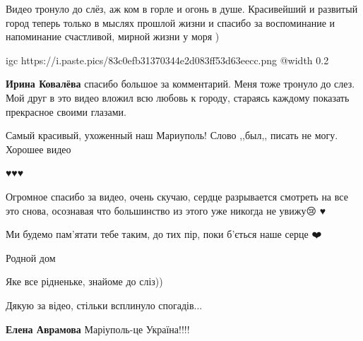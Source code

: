  
 
 
 
 

\qqSecCmt


Видео тронуло до слёз, аж ком в горле и огонь в душе. Красивейший и развитый
город теперь только в мыслях прошлой жизни и спасибо за воспоминание и
напоминание счастливой, мирной жизни у моря )

\ifcmt
  igc https://i.paste.pics/83c0efb31370344e2d083ff53d63eecc.png
	@width 0.2
\fi

\begin{itemize} %
\textbf{Ирина Ковалёва} спасибо большое за комментарий. Меня тоже тронуло до слез. Мой друг в это видео вложил всю любовь к городу, стараясь каждому показать прекрасное своими глазами.
\end{itemize} %


Самый красивый, ухоженный наш Мариуполь! Слово ,,был,, писать не могу. Хорошее
видео


♥️♥️♥️🥹😢


Огромное спасибо за видео, очень скучаю, сердце разрывается смотреть на все это
снова, осознавая что большинство из этого уже никогда не увижу😢 ♥️


Ми будемо пам'ятати тебе таким, до тих пір, поки б'ється наше серце ❤️


Родной дом


Яке все рідненьке, знайоме до сліз))

Дякую за відео, стільки всплинуло спогадів...

\begin{itemize} %
\textbf{Елена Аврамова} Маріуполь-це Україна!!!!
\end{itemize} %

